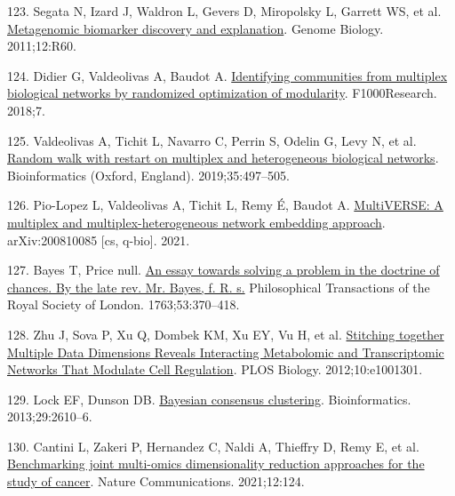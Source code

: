 \documentclass[
  12pt,
  a4paper,
  twoside,
  openright]{book}
\newlength{\cslhangindent}
\newlength{\cslentryspacingunit} %
\newenvironment{CSLReferences}[2] %
 {%
  \setlength{\parindent}{0pt}
  \ifodd #1
  \let\oldpar\par
  \def\par{\hangindent=\cslhangindent\oldpar}
  \fi
  \setlength{\parskip}{#2\cslentryspacingunit}
 }%
 {}
\begin{document}
\begin{CSLReferences}{0}{0}
\leavevmode{}%
123. Segata N, Izard J, Waldron L, Gevers D, Miropolsky L, Garrett WS, et al. \href{https://doi.org/10.1186/gb-2011-12-6-r60}{Metagenomic biomarker discovery and explanation}. Genome Biology. 2011;12:R60.

\leavevmode{}%
124. Didier G, Valdeolivas A, Baudot A. \href{https://doi.org/10.12688/f1000research.15486.2}{Identifying communities from multiplex biological networks by randomized optimization of modularity}. F1000Research. 2018;7.

\leavevmode{}%
125. Valdeolivas A, Tichit L, Navarro C, Perrin S, Odelin G, Levy N, et al. \href{https://doi.org/10.1093/bioinformatics/bty637}{Random walk with restart on multiplex and heterogeneous biological networks}. Bioinformatics (Oxford, England). 2019;35:497--505.

\leavevmode{}%
126. Pio-Lopez L, Valdeolivas A, Tichit L, Remy É, Baudot A. \href{http://arxiv.org/abs/2008.10085}{MultiVERSE: A multiplex and multiplex-heterogeneous network embedding approach}. arXiv:200810085 {[}cs, q-bio{]}. 2021.

\leavevmode{}%
127. Bayes T, Price null. \href{https://doi.org/10.1098/rstl.1763.0053}{An essay towards solving a problem in the doctrine of chances. By the late rev. Mr. Bayes, f. R. s.} Philosophical Transactions of the Royal Society of London. 1763;53:370--418.

\leavevmode{}%
128. Zhu J, Sova P, Xu Q, Dombek KM, Xu EY, Vu H, et al. \href{https://doi.org/10.1371/journal.pbio.1001301}{Stitching together Multiple Data Dimensions Reveals Interacting Metabolomic and Transcriptomic Networks That Modulate Cell Regulation}. PLOS Biology. 2012;10:e1001301.

\leavevmode{}%
129. Lock EF, Dunson DB. \href{https://doi.org/10.1093/bioinformatics/btt425}{Bayesian consensus clustering}. Bioinformatics. 2013;29:2610--6.

\leavevmode{}%
130. Cantini L, Zakeri P, Hernandez C, Naldi A, Thieffry D, Remy E, et al. \href{https://doi.org/10.1038/s41467-020-20430-7}{Benchmarking joint multi-omics dimensionality reduction approaches for the study of cancer}. Nature Communications. 2021;12:124.


\end{CSLReferences}
\end{document}
